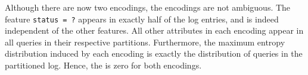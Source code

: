 Although there are now two encodings, the encodings are not ambiguous. The feature \lstinline{status = ?} appears in exactly half of the log entries, and is indeed independent of the other features.  
All other attributes in each encoding appear in all queries in their respective partitions.  
Furthermore, the maximum entropy distribution induced by each encoding is exactly the distribution of queries in the partitioned log.  
Hence, the \errorname is zero for both encodings.

